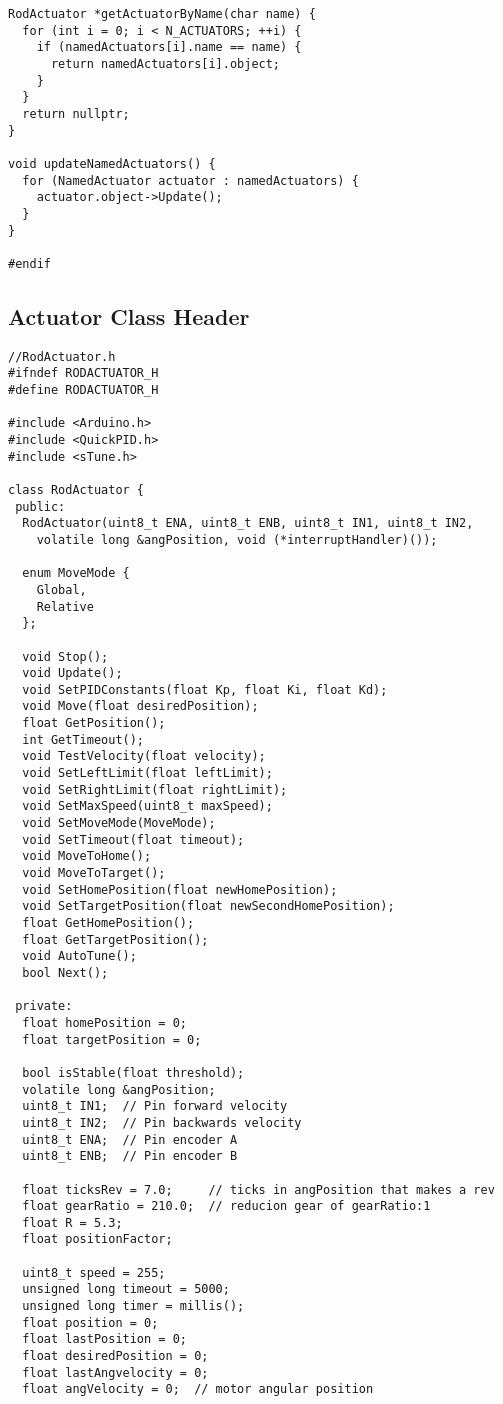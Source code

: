 \begin{verbatim}
RodActuator *getActuatorByName(char name) {
  for (int i = 0; i < N_ACTUATORS; ++i) {
    if (namedActuators[i].name == name) {
      return namedActuators[i].object;
    }
  }
  return nullptr;
}

void updateNamedActuators() {
  for (NamedActuator actuator : namedActuators) {
    actuator.object->Update();
  }
}

#endif
\end{verbatim}

\subsection{Actuator Class Header}
\begin{verbatim}
//RodActuator.h
#ifndef RODACTUATOR_H
#define RODACTUATOR_H

#include <Arduino.h>
#include <QuickPID.h>
#include <sTune.h>

class RodActuator {
 public:  
  RodActuator(uint8_t ENA, uint8_t ENB, uint8_t IN1, uint8_t IN2,
    volatile long &angPosition, void (*interruptHandler)());

  enum MoveMode {
    Global,
    Relative
  };

  void Stop();
  void Update();
  void SetPIDConstants(float Kp, float Ki, float Kd);
  void Move(float desiredPosition);
  float GetPosition();
  int GetTimeout();
  void TestVelocity(float velocity);
  void SetLeftLimit(float leftLimit);
  void SetRightLimit(float rightLimit);
  void SetMaxSpeed(uint8_t maxSpeed);
  void SetMoveMode(MoveMode);
  void SetTimeout(float timeout);
  void MoveToHome();
  void MoveToTarget();
  void SetHomePosition(float newHomePosition);
  void SetTargetPosition(float newSecondHomePosition);
  float GetHomePosition();
  float GetTargetPosition();
  void AutoTune();
  bool Next();

 private:
  float homePosition = 0;
  float targetPosition = 0;

  bool isStable(float threshold);
  volatile long &angPosition;
  uint8_t IN1;  // Pin forward velocity
  uint8_t IN2;  // Pin backwards velocity
  uint8_t ENA;  // Pin encoder A
  uint8_t ENB;  // Pin encoder B

  float ticksRev = 7.0;     // ticks in angPosition that makes a rev
  float gearRatio = 210.0;  // reducion gear of gearRatio:1
  float R = 5.3;
  float positionFactor;

  uint8_t speed = 255;
  unsigned long timeout = 5000;
  unsigned long timer = millis();
  float position = 0;
  float lastPosition = 0;
  float desiredPosition = 0;
  float lastAngvelocity = 0;
  float angVelocity = 0;  // motor angular position


\end{verbatim}
